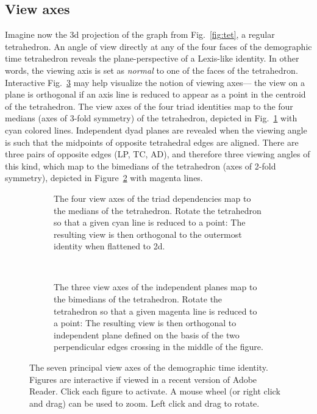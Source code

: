 \documentclass{bmcart}
\begin{document}
\subsection*{View axes}
\label{sec:viewaxes}
Imagine now the 3d projection of the graph from Fig.~\ref{fig:tet}, a regular tetrahedron. An angle of view directly at any of the four faces of the demographic time tetrahedron reveals the plane-perspective of a Lexis-like identity. In other words, the viewing axis is set as \emph{normal} to one of the faces of the tetrahedron. Interactive Fig.~\ref{fig:viewaxes} may help visualize the notion of viewing axes--- the view on a plane is orthogonal if an axis line is reduced to appear as a point in the centroid of the tetrahedron. The view axes of the four triad identities map to the four medians (axes of 3-fold symmetry) of the tetrahedron, depicted in Fig.~\ref{fig:depviewaxes} with cyan colored lines. Independent dyad planes are revealed when the viewing angle is such that the midpoints of opposite tetrahedral edges are aligned. There are three pairs of opposite edges (LP, TC, AD), and therefore three viewing angles of this kind, which map to the bimedians of the tetrahedron (axes of 2-fold symmetry), depicted in Figure~\ref{fig:indepviewaxes} with magenta lines.

\begin{figure}
\begin{subfigure}[t]{0.45\linewidth}
    \centering
    \caption{The four view axes of the triad dependencies map to the medians of the tetrahedron. Rotate the tetrahedron so that a given cyan line is reduced to a point: The resulting view is then orthogonal to the outermost identity when flattened to 2d.}
    \label{fig:depviewaxes}
\end{subfigure}
~~
\begin{subfigure}[t]{0.45\linewidth}
    \caption{The three view axes of the independent planes map to the bimedians of the tetrahedron. Rotate the tetrahedron so that a given magenta line is reduced to a point: The resulting view is then orthogonal to independent plane defined on the basis of the two perpendicular edges crossing in the middle of the figure.}
    \label{fig:indepviewaxes}       
\end{subfigure}
\caption{The seven principal view axes of the demographic time identity. Figures are interactive if viewed in a recent version of Adobe Reader. Click each figure to activate. A mouse wheel (or right click and drag) can be used to zoom. Left click and drag to rotate.}
\label{fig:viewaxes}
\end{figure}
\end{document}
